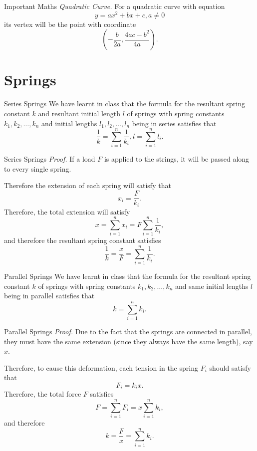 \documentclass{beamer}
\begin{document}
    \begin{frame}{Important Maths}
        \textit{Quadratic Curve.} For a quadratic curve with equation
        \[y = ax^2 + bx + c, a \neq 0\]
        its vertex will be the point with coordinate
        \[
            \left(-\frac{b}{2a}, \frac{4ac-b^2}{4a}\right).
        \]
    \end{frame}

    \section{Springs}

    \begin{frame}{Series Springs}
        We have learnt in class that the formula for the resultant spring constant \(k\) and resultant initial length \(l\) of springs with spring constants \(k_1, k_2, \ldots, k_n\) and initial lengths \(l_1, l_2, \ldots, l_n\) being in series satisfies that\pause
        \[\frac{1}{k} = \sum_{i = 1}^{n} \frac{1}{k_i}, l = \sum_{i = 1}^{n} l_i.\]
    \end{frame}

    \begin{frame}{Series Springs}
        \textit{Proof.} If a load \(F\) is applied to the strings, it will be passed along to every single spring. \pause

        Therefore the extension of each spring will satisfy that
        \[
            x_i = \frac{F}{k_i}.
        \]
        \pause
        Therefore, the total extension will satisfy
        \[
            x = \sum_{i = 1}^{n} x_i = F \sum_{i = 1}^{n} \frac{1}{k_i},
        \]
        \pause
        and therefore the resultant spring constant satisfies
        \[
            \frac{1}{k} = \frac{x}{F} = \sum_{i = 1}^{n} \frac{1}{k_i}.
        \]
    \end{frame}

    \begin{frame}{Parallel Springs}
        We have learnt in class that the formula for the resultant spring constant \(k\) of springs with spring constants \(k_1, k_2, \ldots, k_n\) and \alert{same initial lengths} \(l\) being in parallel satisfies that\pause
        \[k = \sum_{i = 1}^{n} k_i.\]
    \end{frame}

    \begin{frame}{Parallel Springs}
        \textit{Proof.} Due to the fact that the springs are connected in parallel, they must have the same extension (since they always have the same length), say \(x\). \pause
        
        Therefore, to cause this deformation, each tension in the spring \(F_i\) should satisfy that
        \[
            F_i = k_i x.
        \]
        \pause
        Therefore, the total force \(F\) satisfies
        \[
            F = \sum_{i = 1}^{n} F_i = x \sum_{i = 1}^{n} k_i,
        \]
        \pause
        and therefore
        \[
            k = \frac{F}{x} = \sum_{i = 1}^{n} k_i.
        \]
    \end{frame}
\end{document}
